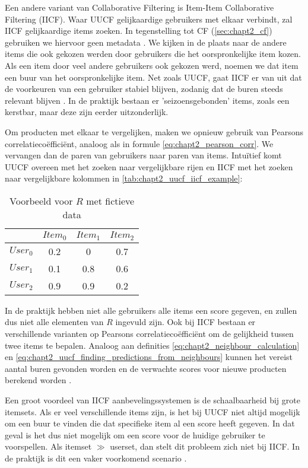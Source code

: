 Een andere variant van Collaborative Filtering is Item-Item Collaborative Filtering (IICF). Waar UUCF gelijkaardige gebruikers met elkaar verbindt, zal IICF gelijkaardige items zoeken. In tegenstelling tot CF (\autoref{sec:chapt2_cf}) gebruiken we hiervoor geen metadata \cite{IICF_original_paper}. We kijken in de plaats naar de andere items die ook gekozen werden door gebruikers die het oorspronkelijke item kozen. Als een item door veel andere gebruikers ook gekozen werd, noemen we dat item een buur van het oorspronkelijke item. Net zoals UUCF, gaat IICF er van uit dat de voorkeuren van een gebruiker stabiel blijven, zodanig dat de buren steeds relevant blijven \cite{cursus_hs9}. In de praktijk bestaan er 'seizoensgebonden' items, zoals een kerstbar, maar deze zijn eerder uitzonderlijk.

Om producten met elkaar te vergelijken, maken we opnieuw gebruik van Pearsons correlatiecoëfficiënt, analoog als in formule \ref{eq:chapt2_pearson_corr}. We vervangen dan de paren van gebruikers naar paren van items.
Intuïtief komt UUCF overeen met het zoeken naar vergelijkbare rijen en IICF met het zoeken naar vergelijkbare kolommen in \autoref{tab:chapt2_uucf_iicf_example}:

\begin{table}[H]
\centering
\begin{tabular}{c|ccc}
         & $Item_0$ & $Item_1$ & $Item_2$ \\ \hline
$User_0$ & 0.2      & 0        & 0.7      \\
$User_1$ & 0.1      & 0.8      & 0.6      \\
$User_2$ & 0.9      & 0.9      & 0.2     
\end{tabular}
\caption{Voorbeeld voor $R$ met fictieve data}
\label{tab:chapt2_uucf_iicf_example}
\end{table}

In de praktijk hebben niet alle gebruikers alle items een score gegeven, en zullen dus niet alle elementen van $R$ ingevuld zijn. Ook bij IICF bestaan er verschillende varianten op Pearsons correlatiecoëfficiënt om de gelijkheid tussen twee items te bepalen. Analoog aan definities \ref{eq:chapt2_neighbour_calculation} en \ref{eq:chapt2_uucf_finding_predictions_from_neighbours} kunnen het vereist aantal buren gevonden worden en de verwachte scores voor nieuwe producten berekend worden \cite{IICF_original_paper}.

Een groot voordeel van IICF aanbevelingssystemen is de schaalbaarheid bij grote itemsets. Als er veel verschillende items zijn, is het bij UUCF niet altijd mogelijk om een buur te vinden die dat specifieke item al een score heeft gegeven. In dat geval is het dus niet mogelijk om een score voor de huidige gebruiker te voorspellen. Als itemset $\gg$ userset, dan stelt dit probleem zich niet bij IICF. In de praktijk is dit een vaker voorkomend scenario \cite{recsys_handbook}.

